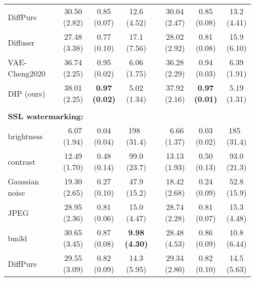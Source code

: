 \begin{table*}[!tb]
{\begin{tabular}{l c ccc c ccc}
\rowcolor{Gray}
\small{DiffPure} & & \small{30.50 \small{(2.82)}} & \small{0.85 \small{(0.07)}} & \small{12.6 \small{(4.52)}} & & \small{30.04 \small{(2.47)}} & \small{0.85 \small{(0.08)}} & \small{13.2 \small{(4.41)}}\\
\rowcolor{Gray}
\small{Diffuser} & & \small{27.48 \small{(3.38)}} & \small{0.77 \small{(0.10)}} & \small{17.1 \small{(7.56)}} & & \small{28.02 \small{(2.92)}} & \small{0.81 \small{(0.08)}} & \small{15.9 \small{(6.10)}}\\
\rowcolor{Gray}
\small{VAE-Cheng2020} & & \small{36.74 \small{(2.25)}} & \small{0.95 \small{(0.02)}} & \small{6.06 \small{(1.75)}} & & \small{36.28 \small{(2.29)}} & \small{0.94 \small{(0.03)}} & \small{6.39 \small{(1.91)}}\\
\hdashline
\rowcolor{Gray}
\small{DIP (ours)} & & \small{38.01 \small{(2.25)}} & \small{\textbf{0.97 \small{(0.02)}}} & \small{5.02 \small{(1.34)}} & & \small{37.92 \small{(2.16)}} & \small{\textbf{0.97 \small{(0.01)}}} & \small{5.19 \small{(1.31)}}
\\
\midrule
\vspace{-0.9em}
\\
\multicolumn{3}{l}{\small{\textbf{SSL watermarking: } }} & \multicolumn{6}{r}{}\\
\small{brightness} & & \small{~6.07 \small{(1.94)}} & \small{0.04 \small{(0.04)}} & \small{198~ \small{(31.4)}} & & \small{~6.66 \small{(1.37)}} & \small{0.03 \small{(0.02)}} & \small{185~ \small{(31.4)}}\\
\small{contrast} & & \small{12.49 \small{(1.70)}} & \small{0.48 \small{(0.14)}} & \small{99.0 \small{(23.7)}} & & \small{13.13 \small{(1.93)}} & \small{0.50 \small{(0.13)}} & \small{93.0 \small{(21.3)}}\\
\small{Gaussian noise} & & \small{19.30 \small{(2.65)}} & \small{0.27 \small{(0.10)}} & \small{47.9 \small{(15.2)}} & & \small{18.42 \small{(2.68)}} & \small{0.24 \small{(0.09)}} & \small{52.8 \small{(15.9)}}\\
\small{JPEG} & & \small{28.95 \small{(2.36)}} & \small{0.81 \small{(0.06)}} & \small{15.0 \small{(4.47)}} & & \small{28.74 \small{(2.28)}} & \small
{0.81 \small{(0.07)}} & \small{15.3 \small{(4.48)}}\\
\rowcolor{Gray}
\small{bm3d} & & \small{30.65 \small{(3.45)}} & \small{0.87 \small{(0.08)}} & \small{\textbf{9.98 \small{(4.30)}}} & & \small{28.48 \small{(4.53)}} & \small{0.86 \small{(0.09)}} & \small{10.8 \small{(6.44)}}\\
\rowcolor{Gray}
\small{DiffPure} & & \small{29.55 \small{(3.09)}} & \small{0.82 \small{(0.09)}} & \small{14.3 \small{(5.95)}} & & \small{29.34 \small{(2.80)}} & \small{0.82 \small{(0.10)}} & \small{14.5 \small{(5.63)}}\\

\end{tabular}}
\end{table*}
